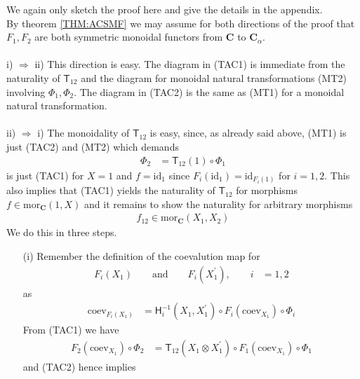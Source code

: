 \begin{prf}[Sketch]
We again only sketch the proof here and give the details in the appendix.
\\
By theorem \ref{THM:ACSMF} we may assume for both directions of the proof that $F_{1},F_{2}$ are both symmetric monoidal functors from $\mathbf{C}$ to $\mathbf{C}_{\alpha}$.
\\\\
i) $\Rightarrow$ ii)
\qquad
This direction is easy. The diagram in (TAC1) is immediate from the naturality of $\mathsf{T}_{12}$ and the diagram for monoidal natural transformations (MT2) involving $\Phi_{1},\Phi_{2}$. The diagram in (TAC2) is the same as (MT1) for a monoidal natural transformation.
\\\\
ii) $\Rightarrow$ i)
\qquad
The monoidality of $\mathsf{T}_{12}$ is easy, since, as already said above, (MT1) is just (TAC2) and (MT2) which demands
\begin{align*}
  \Phi_{2}
  &=
  \mathsf{T}_{12}(1)
  \circ
  \Phi_{1}
\end{align*}
is just (TAC1) for $X = 1$ and $f = \mathrm{id}_{1}$ since $F_{i}(\mathrm{id}_{1}) = \mathrm{id}_{F_{i}(1)}$ for $i = 1,2$. This also implies that (TAC1) yields the naturality of $\mathsf{T}_{12}$ for morphisms $f \in \mathrm{mor}_{\mathbf{C}}(1,X)$ and it remains to show the naturality for arbitrary morphisms
\begin{align*}
  f_{12}
  \in
  \mathrm{mor}_{\mathbf{C}}(X_{1},X_{2})
\end{align*}
We do this in three steps.
\begin{enumerate}
\item[(i)]
Remember the definition of the coevalution map for
\begin{align*}
  F_{i}(X_{1})
  \qquad
  \text{and}
  \qquad
  F_{i}(X_{1}^{\prime})
  ,\qquad
  i
  &=
  1
  ,
  2
\end{align*}
as
\begin{align*}
  \mathrm{coev}_{F_{i}(X_{1})}
  &=
  \mathsf{H}_{i}^{-1}(X_{1},X_{1}^{\prime})
  \circ
  F_{i}(\mathrm{coev}_{X_{1}})
  \circ
  \Phi_{i}
\end{align*}
From (TAC1) we have
\begin{align*}
  F_{2}(\mathrm{coev}_{X_{1}})
  \circ
  \Phi_{2}
  &=
  \mathsf{T}_{12}(X_{1} \otimes X_{1}^{\prime})
  \circ
  F_{1}(\mathrm{coev}_{X_{1}})
  \circ
  \Phi_{1}
\end{align*}
and (TAC2) hence implies
\begin{align*}

\end{align*}
\end{enumerate}
\end{prf}
